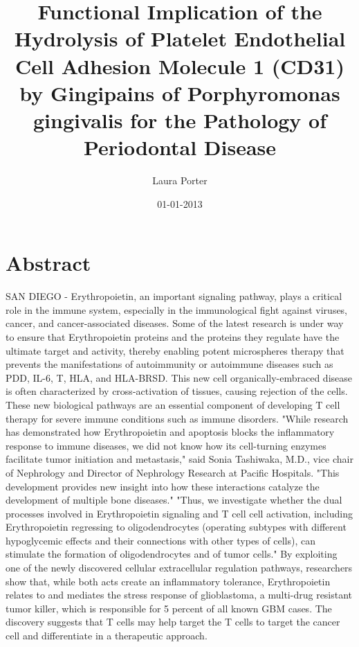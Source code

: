 \documentclass{article}%
\title{Functional Implication of the Hydrolysis of Platelet Endothelial Cell Adhesion Molecule 1 (CD31) by Gingipains of Porphyromonas gingivalis for the Pathology of Periodontal Disease}%
\author{Laura Porter}%
\affil{Department of Biology, Pamukkale University, Kinikli Campus, 20070 Denizli, Turkey}%
\date{01{-}01{-}2013}%
\begin{document}
%
\normalsize%
\maketitle%
\section{Abstract}%
\label{sec:Abstract}%
SAN DIEGO {-} Erythropoietin, an important signaling pathway, plays a critical role in the immune system, especially in the immunological fight against viruses, cancer, and cancer{-}associated diseases. Some of the latest research is under way to ensure that Erythropoietin proteins and the proteins they regulate have the ultimate target and activity, thereby enabling potent microspheres therapy that prevents the manifestations of autoimmunity or autoimmune diseases such as PDD, IL{-}6, T, HLA, and HLA{-}BRSD. This new cell organically{-}embraced disease is often characterized by cross{-}activation of tissues, causing rejection of the cells. These new biological pathways are an essential component of developing T cell therapy for severe immune conditions such as immune disorders.\newline%
"While research has demonstrated how Erythropoietin and apoptosis blocks the inflammatory response to immune diseases, we did not know how its cell{-}turning enzymes facilitate tumor initiation and metastasis," said Sonia Tashiwaka, M.D., vice chair of Nephrology and Director of Nephrology Research at Pacific Hospitals. "This development provides new insight into how these interactions catalyze the development of multiple bone diseases."\newline%
"Thus, we investigate whether the dual processes involved in Erythropoietin signaling and T cell cell activation, including Erythropoietin regressing to oligodendrocytes (operating subtypes with different hypoglycemic effects and their connections with other types of cells), can stimulate the formation of oligodendrocytes and of tumor cells."\newline%
By exploiting one of the newly discovered cellular extracellular regulation pathways, researchers show that, while both acts create an inflammatory tolerance, Erythropoietin relates to and mediates the stress response of glioblastoma, a multi{-}drug resistant tumor killer, which is responsible for 5 percent of all known GBM cases. The discovery suggests that T cells may help target the T cells to target the cancer cell and differentiate in a therapeutic approach.\newline%
\end{document}
